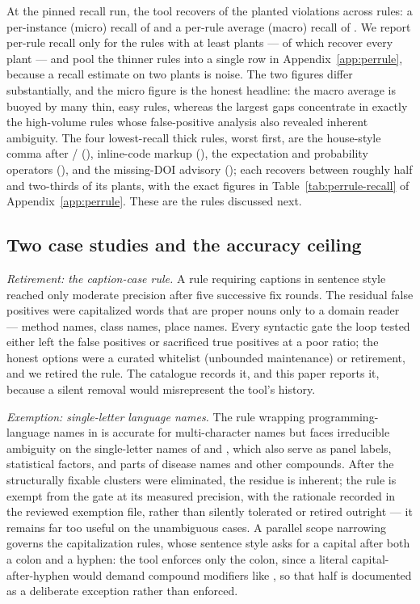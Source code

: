 \documentclass[nojss,article]{jss}
\newcommand{\rulelink}[1]{\hyperlink{rule:#1}{\code{#1}}}
\begin{document}
At the pinned recall run, the tool recovers \StatRecallTP{} of the
\StatRecallPlants{} planted violations across
\StatRecallRules{} rules: a per-instance (micro) recall of
\StatRecallMicro{} and a per-rule average (macro) recall of
\StatRecallMacro{}. We report per-rule recall only for the
\StatRecallThickRules{} rules with at least \StatRecallMinPlants{}
plants --- \StatRecallPerfect{} of which recover every plant --- and
pool the thinner rules into a single row in
Appendix~\ref{app:perrule}, because a recall estimate on two plants
is noise. The two figures differ substantially, and the micro figure
is the honest headline: the macro average is buoyed by many thin,
easy rules, whereas the largest gaps concentrate in exactly the
high-volume rules whose false-positive analysis also revealed
inherent ambiguity. The four lowest-recall thick rules, worst first,
are the house-style comma after /
(\rulelink{JSS-HOUSE-001}), inline-code markup
(\rulelink{JSS-MARKUP-003}), the expectation and probability
operators (\rulelink{JSS-OPER-004}), and the missing-DOI advisory
(\rulelink{JSS-REFS-003}); each recovers between roughly half and
two-thirds of its plants, with the exact figures in
Table~\ref{tab:perrule-recall} of Appendix~\ref{app:perrule}. These
are the rules discussed next.

\subsection{Two case studies and the accuracy ceiling}
\label{sec:casestudies}

\emph{Retirement: the caption-case rule.} A rule requiring captions
in sentence style reached only moderate precision after five
successive fix rounds. The residual false positives were capitalized
words that are proper nouns only to a domain reader --- method names,
 class names, place names. Every syntactic gate the loop
tested either left the false positives or sacrificed true positives
at a poor ratio; the honest options were a curated whitelist
(unbounded maintenance) or retirement, and we retired the rule. The
catalogue records it, and this paper reports it, because a silent
removal would misrepresent the tool's history.

\emph{Exemption: single-letter language names.} The rule wrapping
programming-language names in  is
accurate for multi-character names but faces irreducible ambiguity on
the single-letter names of  and , which also
serve as panel labels, statistical factors, and parts of disease
names and other compounds. After the
structurally fixable clusters were eliminated, the residue is
inherent; the rule is exempt from the gate at its measured precision,
with the rationale recorded in the reviewed exemption file, rather
than silently tolerated or retired outright --- it remains far too
useful on the unambiguous cases. A parallel scope narrowing governs the
capitalization rules, whose sentence style asks for a capital after both
a colon and a hyphen: the tool enforces only the colon, since a literal
capital-after-hyphen would demand compound modifiers like
, so that half is documented as a deliberate exception
rather than enforced.
\end{document}
